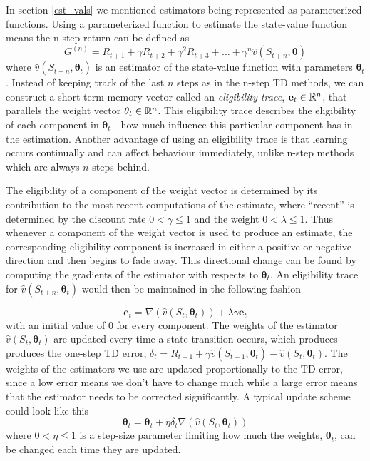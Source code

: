\documentclass[11pt]{article}
\begin{document}
In section \ref{est_vals} we mentioned estimators being represented as
parameterized functions.
Using a parameterized function to estimate the state-value function means
the n-step return can be defined as
\begin{equation}
    G^{(n)} = R_{t+1} + \gamma  R_{t+2} + \gamma^2  R_{t+3} + \dots + \gamma^n  \hat{v}(S_{t+n}, \mathbf{\theta})
\end{equation}
where $\hat{v}(S_{t+n}, \mathbf{\theta}_t)$ is an estimator of the
state-value function with parameters $\mathbf{\theta}_t$.
Instead of keeping track of the last $n$ steps as in the n-step TD
methods,
we can construct a short-term memory vector called an \textit{eligibility trace}, $\mathbf{e}_t \in \mathbb{R}^n$,
that parallels the weight vector $\mathbf{\theta}_t \in \mathbb{R}^n$\cite{RLbook}.
This eligibility trace describes the eligibility of each component in $\mathbf{\theta}_t$ -
how much influence this particular component has in the estimation.
Another advantage of using an eligibility trace is that
learning occurs continually and can affect behaviour immediately,
unlike n-step methods which are always $n$ steps behind.

The eligibility of a component of the weight vector is determined
by its contribution to the most recent computations of the estimate,
where “recent” is determined by the discount rate $0 < \gamma \leq 1$ and the weight
$0 < \lambda \leq 1$.
Thus whenever a component of the weight vector
is used to produce an estimate, the corresponding eligibility component
is increased in either a positive or negative direction and then begins to fade away.
This directional change can be found by computing the
gradients of the estimator with respects to $\mathbf{\theta}_t$\cite{RLbook}.
An eligibility trace for $\hat{v}(S_{t+n}, \mathbf{\theta}_t)$ would then
be maintained in the following fashion

\begin{equation}
    \mathbf{e}_t = \nabla(\hat{v}(S_t, \mathbf{\theta}_t)) + \lambda  \gamma  \mathbf{e}_t
\end{equation}
with an initial value of 0 for every component.
The weights of the estimator $\hat{v}(S_t, \mathbf{\theta}_t)$ are
updated every time a state transition occurs, which produces
produces the one-step TD error, $\delta_t = R_{t+1} + \gamma  \hat{v}(S_{t+1}, \mathbf{\theta}_t) - \hat{v}(S_t, \mathbf{\theta}_t)$.
The weights of the estimators we use are updated proportionally to the TD error, since
a low error means we don't have to change much while a large error means that
the estimator needs to be corrected significantly.
A typical update scheme could look like this
\begin{equation}
    \mathbf{\theta}_t = \mathbf{\theta}_t + \eta  \delta_t  \nabla(\hat{v}(S_t, \mathbf{\theta}_t))
\end{equation}
where $0 < \eta \leq 1$ is a step-size parameter limiting how much the weights,
$\mathbf{\theta}_t$, can be changed each time they are updated.
\end{document}
